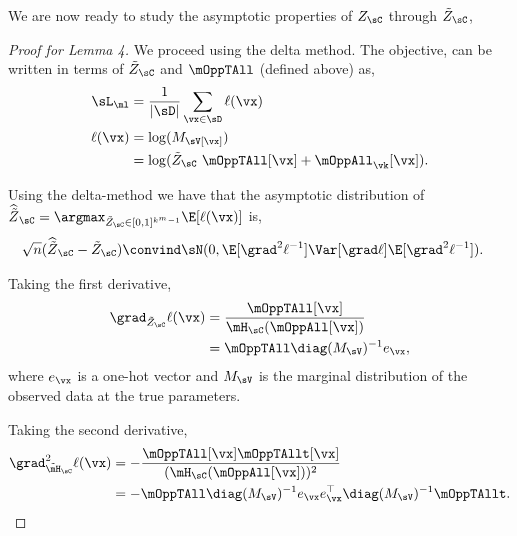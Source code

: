 We are now ready to study the asymptotic properties of $Z_\sC$ through
$\tilde Z_\sC$,
\begin{proof}[Proof for Lemma 4]
  We proceed using the delta method. The objective,
   can be written in terms of $\tilde Z_\sC$
  and $\mOppTAll$ (defined above) as,
  \begin{align*}
    \sL_\ml &= \frac{1}{|\sD|} \sum_{\vx \in \sD} \ell(\vx) \\
    \ell(\vx) &= \log(M_\sV[\vx]) \\
              &= \log(\tilde Z_\sC\ \mOppTAll[\vx] + \mOppAll_{\vk}[\vx]).
  \end{align*}

Using the delta-method \cite{vaart98asymptotic} we have that the asymptotic distribution of 
  $\widehat{{\tilde Z}}_\sC = \argmax_{\tilde Z_\sC \in [0,1]^{k^m-1}} \E[\ell(\vx)]$ is,
  \begin{align*}
    \sqrt{n}(\widehat{\tilde{Z}}_{\sC} - \tilde{Z}_{\sC}) 
      &\convind \sN( 0, \E[\grad^2 \ell^{-1}] \Var[\grad \ell] \E[\grad^2 \ell^{-1}]).
  \end{align*}

Taking the first derivative,
\begin{align}
  \grad_{\tilde Z_\sC} \ell(\vx)
  &= \frac{\mOppTAll[\vx]}{\mH_\sC(\mOppAll[\vx]) } \nonumber \\ 
  &= \mOppTAll \diag(M_{\sV})^{-1} e_\vx, \label{eqn:lhood-grad}
\end{align}
where $e_\vx$ is a one-hot vector and $M_\sV$ is the marginal
distribution of the observed data at the true parameters.

Taking the second derivative,
\begin{align}
  \grad^2_{\tilde \mH_\sC} \ell(\vx)
  &= - \frac{\mOppTAll[\vx] \mOppTAllt[\vx]}{(\mH_\sC(\mOppAll[\vx]))^2} \nonumber \\
  &= - \mOppTAll \diag(M_{\sV})^{-1} e_\vx e_\vx^\top  \diag(M_{\sV})^{-1} \mOppTAllt. \label{eqn:lhood-hess}%
\end{align}


\end{proof}
